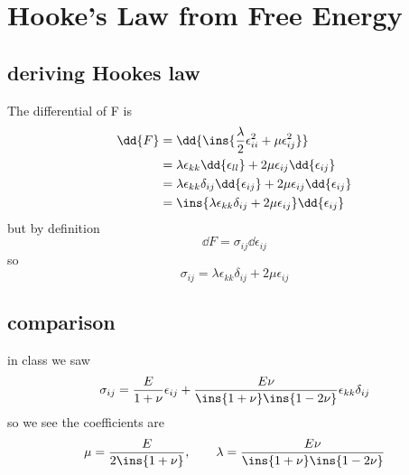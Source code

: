 \clearpage
\section{Hooke’s Law from Free Energy}
\subsection{deriving Hookes law}
The differential of F is 
\begin{align}
    \dd{F}&=\dd{\ins{\frac{\lambda}{2}\epsilon_{ii}^2+\mu\epsilon_{ij}^2}}\\
    &= \lambda\epsilon_{kk}\dd{\epsilon_{ll}}+2\mu\epsilon_{ij}\dd{\epsilon_{ij}}\\
    &= \lambda\epsilon_{kk}\delta_{ij}\dd{\epsilon_{ij}}+2\mu\epsilon_{ij}\dd{\epsilon_{ij}}\\
    &= \ins{\lambda\epsilon_{kk}\delta_{ij}+2\mu\epsilon_{ij}}\dd{\epsilon_{ij}}
\end{align}
but by definition
\begin{equation}
    \dd{F}=\sigma_{ij}\dd{\epsilon_{ij}}
\end{equation}
so 
\begin{equation}
    \sigma_{ij}=\lambda\epsilon_{kk}\delta_{ij}+2\mu\epsilon_{ij}
\end{equation}
\subsection{comparison}
in class we saw 
\begin{equation}
    \sigma_{ij}=\frac{E}{1+\nu}\epsilon_{ij}+\frac{E\nu}{\ins{1+\nu}\ins{1-2\nu}}\epsilon_{kk}\delta_{ij}
\end{equation}
so we see the coefficients are 
\begin{equation}
    \mu = \frac{E}{2\ins{1+\nu}},\qquad \lambda=\frac{E\nu}{\ins{1+\nu}\ins{1-2\nu}}
\end{equation}